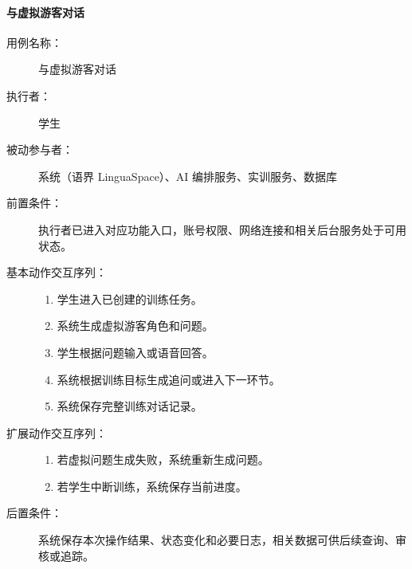 \paragraph{与虚拟游客对话}
\begin{description}
  \item[用例名称：] 与虚拟游客对话
  \item[执行者：] 学生
  \item[被动参与者：] 系统（语界 LinguaSpace）、AI 编排服务、实训服务、数据库
  \item[前置条件：] 执行者已进入对应功能入口，账号权限、网络连接和相关后台服务处于可用状态。
  \item[基本动作交互序列：]
  \begin{enumerate}
    \item 学生进入已创建的训练任务。
    \item 系统生成虚拟游客角色和问题。
    \item 学生根据问题输入或语音回答。
    \item 系统根据训练目标生成追问或进入下一环节。
    \item 系统保存完整训练对话记录。
  \end{enumerate}
  \item[扩展动作交互序列：]
  \begin{enumerate}
    \item[2a.] 若虚拟问题生成失败，系统重新生成问题。
    \item[3a.] 若学生中断训练，系统保存当前进度。
  \end{enumerate}
  \item[后置条件：] 系统保存本次操作结果、状态变化和必要日志，相关数据可供后续查询、审核或追踪。
\end{description}

